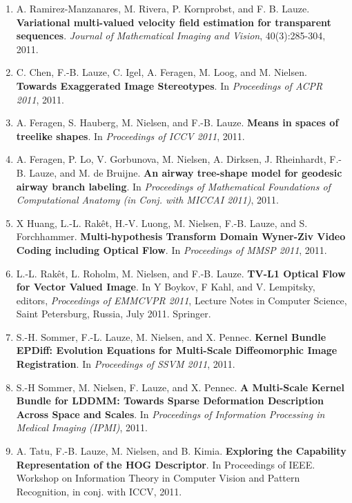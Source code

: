 \documentclass[10pt]{article}
\begin{document}
\begin{description}
\begin{enumerate}
  \item A. Ramirez-Manzanares, M. Rivera, P. Kornprobst, and F. B. Lauze.
    \textbf{Variational multi-valued velocity field estimation for transparent sequences}.
    \textit{Journal of Mathematical Imaging and Vision}, 40(3):285-304, 2011.

  \item C. Chen, F.-B. Lauze, C. Igel, A. Feragen, M. Loog, and M. Nielsen.
    \textbf{Towards Exaggerated Image Stereotypes}.  In \textit{Proceedings of ACPR 2011},
    2011.

  \item A. Feragen, S. Hauberg, M. Nielsen, and F.-B. Lauze.  \textbf{Means in spaces of
      treelike shapes}.  In \textit{Proceedings of ICCV 2011}, 2011.

  \item A. Feragen, P. Lo, V. Gorbunova, M. Nielsen, A. Dirksen, J. Rheinhardt,
    F.-B. Lauze, and M. de Bruijne.  \textbf{An airway tree-shape model for geodesic
      airway branch labeling}.  In \textit{Proceedings of Mathematical Foundations of
      Computational Anatomy (in Conj. with MICCAI 2011)}, 2011.

  \item X Huang, L.-L. Rak{\^e}t, H.-V. Luong, M. Nielsen, F.-B. Lauze, and
    S. Forchhammer.  \textbf{Multi-hypothesis Transform Domain Wyner-Ziv Video Coding
      including Optical Flow}.  In \textit{Proceedings of MMSP 2011}, 2011.

  \item L.-L. Rak{\^e}t, L. Roholm, M. Nielsen, and F.-B. Lauze.  \textbf{TV-L1 Optical
      Flow for Vector Valued Image}.  In Y Boykov, F Kahl, and V. Lempitsky, editors,
    \textit{Proceedings of EMMCVPR 2011}, Lecture Notes in Computer Science, Saint
    Petersburg, Russia, July 2011.  Springer.

  \item S.-H. Sommer, F.-L. Lauze, M. Nielsen, and X. Pennec.  \textbf{Kernel Bundle
      EPDiff: Evolution Equations for Multi-Scale Diffeomorphic Image Registration}.  In
    \textit{Proceedings of SSVM 2011}, 2011.

  \item S.-H Sommer, M. Nielsen, F. Lauze, and X. Pennec.  \textbf{A Multi-Scale Kernel
      Bundle for LDDMM: Towards Sparse Deformation Description Across Space and Scales}.
    In \textit{Proceedings of Information Processing in Medical Imaging (IPMI)}, 2011.

  \item A. Tatu, F.-B. Lauze, M. Nielsen, and B. Kimia.  \textbf{Exploring the Capability
      Representation of the HOG Descriptor}.  In Proceedings of IEEE. Workshop on
      Information Theory in Computer Vision and Pattern Recognition, in conj. with ICCV, 2011.


\end{enumerate}
\end{description}
\end{document}
